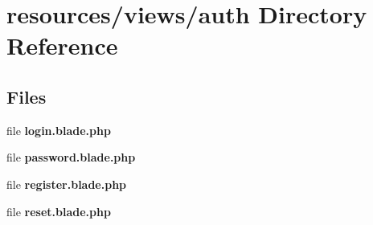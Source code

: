 \section{resources/views/auth Directory Reference}
\label{dir_fe2e23602f98f3798d4e29e6980a478a}
\subsection*{Files}
\begin{DoxyCompactItemize}
\item 
file {\bf login.\+blade.\+php}
\item 
file {\bf password.\+blade.\+php}
\item 
file {\bf register.\+blade.\+php}
\item 
file {\bf reset.\+blade.\+php}
\end{DoxyCompactItemize}
